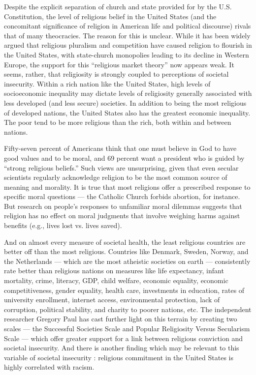 \documentclass[a4paper,14pt]{extarticle}
\begin{document}
Despite the explicit separation of church and state provided for by the U.S. Constitution, the level of religious belief in the United States (and the concomitant significance of religion in American life and political discourse) rivals that of many theocracies.
The reason for this is unclear.
While it has been widely argued that religious pluralism and competition have caused religion to flourish in the United States, with state-church monopolies leading to its decline in Western Europe, the support for this ``religious market theory'' now appears weak.
It seems, rather, that religiosity is strongly coupled to perceptions of societal insecurity.
Within a rich nation like the United States, high levels of socioeconomic inequality may dictate levels of religiosity generally associated with less developed (and less secure) societies.
In addition to being the most religious of developed nations, the United States also has the greatest economic inequality.
The poor tend to be more religious than the rich, both within and between nations.

Fifty-seven percent of Americans think that one must believe in God to have good values and to be moral, and 69 percent want a president who is guided by ``strong religious beliefs.''
Such views are unsurprising, given that even secular scientists regularly acknowledge religion to be the most common source of meaning and morality.
It is true that most religions offer a prescribed response to specific moral questions --- the Catholic Church forbids abortion, for instance.
But research on people’s responses to unfamiliar moral dilemmas suggests that religion has no effect on moral judgments that involve weighing harms against benefits (e.g., lives lost vs. lives saved).

And on almost every measure of societal health, the least religious countries are better off than the most religious.
Countries like Denmark, Sweden, Norway, and the Netherlands --- which are the most atheistic societies on earth --- consistently rate better than religious nations on measures like life expectancy, infant mortality, crime, literacy, GDP, child welfare, economic equality, economic competitiveness, gender equality, health care, investments in education, rates of university enrollment, internet access, environmental protection, lack of corruption, political stability, and charity to poorer nations, etc.
The independent researcher Gregory Paul has cast further light on this terrain by creating two scales --- the Successful Societies Scale and Popular Religiosity Versus Secularism Scale --- which offer greater support for a link between religious conviction and societal insecurity.
And there is another finding which may be relevant to this variable of societal insecurity :
religious commitment in the United States is highly correlated with racism.
\end{document}
